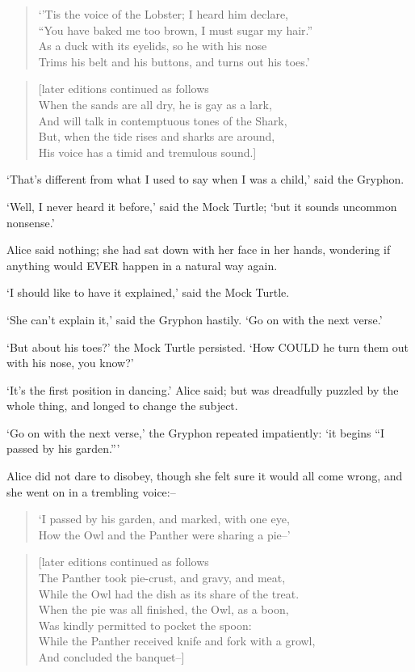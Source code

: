 \documentclass[12pt]{book}
\begin{document}
\begin{verse}
    `'Tis the voice of the Lobster; I heard him declare,\\
    ``You have baked me too brown, I must sugar my hair.''\\
    As a duck with its eyelids, so he with his nose\\
    Trims his belt and his buttons, and turns out his toes.'
\end{verse}
\begin{verse}
              [later editions continued as follows\\
    When the sands are all dry, he is gay as a lark,\\
    And will talk in contemptuous tones of the Shark,\\
    But, when the tide rises and sharks are around,\\
    His voice has a timid and tremulous sound.]
\end{verse}

  `That's different from what I used to say when I was a child,'
said the Gryphon.

  `Well, I never heard it before,' said the Mock Turtle; `but it
sounds uncommon nonsense.'

  Alice said nothing; she had sat down with her face in her
hands, wondering if anything would EVER happen in a natural way
again.

  `I should like to have it explained,' said the Mock Turtle.

  `She can't explain it,' said the Gryphon hastily.  `Go on with
the next verse.'

  `But about his toes?' the Mock Turtle persisted.  `How COULD
he turn them out with his nose, you know?'

  `It's the first position in dancing.' Alice said; but was
dreadfully puzzled by the whole thing, and longed to change the
subject.

  `Go on with the next verse,' the Gryphon repeated impatiently:
`it begins ``I passed by his garden.'''

  Alice did not dare to disobey, though she felt sure it would
all come wrong, and she went on in a trembling voice:--

\begin{verse}
    `I passed by his garden, and marked, with one eye,\\
    How the Owl and the Panther were sharing a pie--'
\end{verse}
\begin{verse}
        [later editions continued as follows\\
    The Panther took pie-crust, and gravy, and meat,\\
    While the Owl had the dish as its share of the treat.\\
    When the pie was all finished, the Owl, as a boon,\\
    Was kindly permitted to pocket the spoon:\\
    While the Panther received knife and fork with a growl,\\
    And concluded the banquet--]
\end{verse}
\end{document}
